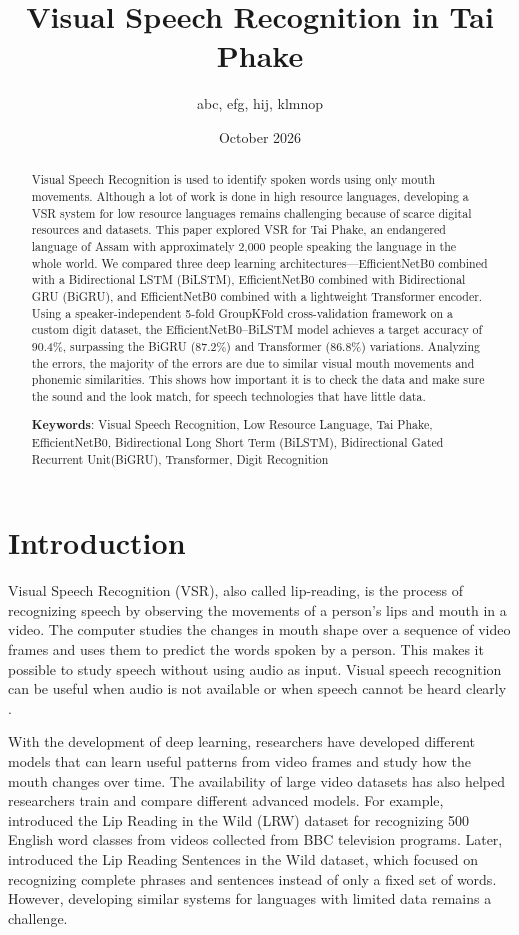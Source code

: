 \documentclass[journal]{IEEEtran}
\title{Visual Speech Recognition in Tai Phake}
\author{abc, efg, hij, klmnop}
\date{October 2026}
\begin{document}
\maketitle
\begin{abstract}
    Visual Speech Recognition is used to identify spoken words using only mouth movements. Although a lot of work is done in high resource languages, developing a VSR system for low resource languages remains challenging because of scarce digital resources and datasets. This paper explored VSR for Tai Phake, an endangered language of Assam with approximately 2,000 people speaking the language in the whole world. We compared three deep learning architectures—EfficientNetB0 combined with a Bidirectional LSTM (BiLSTM), EfficientNetB0 combined with Bidirectional GRU (BiGRU), and EfficientNetB0 combined with a lightweight Transformer encoder. Using a speaker-independent 5-fold GroupKFold cross-validation framework on a custom digit dataset, the EfficientNetB0–BiLSTM model achieves a target accuracy of 90.4\%, surpassing the BiGRU (87.2\%) and Transformer (86.8\%) variations. Analyzing the errors, the majority of the errors are due to similar visual mouth movements and phonemic similarities. This shows how important it is to check the data and make sure the sound and the look match, for speech technologies that have little data.

    \textbf{Keywords}: Visual Speech Recognition, Low Resource Language, Tai Phake, EfficientNetB0, Bidirectional Long Short Term (BiLSTM), Bidirectional Gated Recurrent Unit(BiGRU), Transformer, Digit Recognition
\end{abstract}


\section{Introduction}

Visual Speech Recognition (VSR), also called lip-reading, is the process of recognizing speech by observing the movements of a person's lips and mouth in a video. The computer studies the changes in mouth shape over a sequence of video frames and uses them to predict the words spoken by a person. This makes it possible to study speech without using audio as input. Visual speech recognition can be useful when audio is not available or when speech cannot be heard clearly \cite{fernandezlopez2018survey}.

With the development of deep learning, researchers have developed different models that can learn useful patterns from video frames and study how the mouth changes over time. The availability of large video datasets has also helped researchers train and compare different advanced models. For example, \cite{chung2016lipreading} introduced the Lip Reading in the Wild (LRW) dataset for recognizing 500 English word classes from videos collected from BBC television programs. Later, \cite{chung2017sentences} introduced the Lip Reading Sentences in the Wild dataset, which focused on recognizing complete phrases and sentences instead of only a fixed set of words. However, developing similar systems for languages with limited data remains a challenge.
\end{document}
